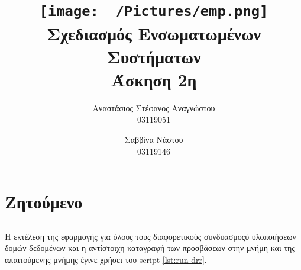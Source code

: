 \documentclass{article}
\title{
    \texttt{[image: ~/Pictures/emp.png]} \\
    \vskip 5cm
    Σχεδιασμός Ενσωματωμένων Συστήματων \\
    \large Άσκηση 2η
    \vskip 5cm
}
\author{
    Αναστάσιος Στέφανος Αναγνώστου \\ \large 03119051 \and
    Σαββίνα Νάστου \\ \large 03119146
}
\newcommand{\eng}[1]{\foreignlanguage{english}{#1}} %
\begin{document}
\maketitle \clearpage \tableofcontents \clearpage

\section{Ζητούμενο}

\subsection{}

Η εκτέλεση της εφαρμογής για όλους τους διαφορετικούς
συνδυασμοςύ υλοποιήσεων δομών δεδομένων και η αντίστοιχη
καταγραφή των προσβάσεων στην μνήμη και της απαιτούμενης
μνήμης έγινε χρήσει του \eng{script} \ref{lst:run-drr}.
\end{document}
